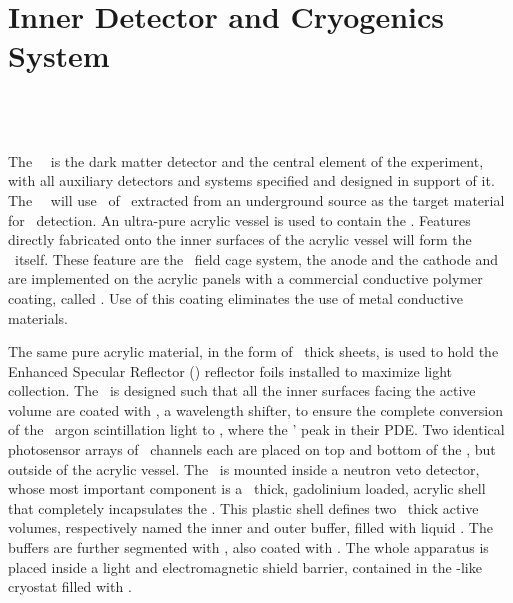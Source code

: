 \section{Inner Detector and Cryogenics System}
\label{sec:TPCCryo}


\subsection{\DSks\ \LArTPC}  
\label{sec:TPC}


The \DSk\ \LArTPC\ is the dark matter detector and the central element of the experiment, with all auxiliary detectors and systems specified and designed in support of it.  The \DSks\ \LArTPC\ will use \DSkCryogenicsCapableLArMass\ of \LAr\ extracted from an underground source as the target material for \WIMP\ detection.   An ultra-pure acrylic vessel is used to contain the \LAr.  Features directly fabricated onto the inner surfaces of the acrylic vessel will form the \TPC\ itself.  These feature are the \TPC\ field cage system, the anode and the cathode and are implemented on the acrylic panels with a commercial conductive polymer coating, called \Clevios.  Use of this coating eliminates the use of metal conductive materials. 

The same pure acrylic material, in the form of \DSkPMMATPCBackPanelThicknessESR\ thick sheets, is used to hold the Enhanced Specular Reflector (\ESR) reflector foils installed to maximize light collection. The \TPC\ is designed such that all the inner surfaces facing the active volume are coated with \TPB, a wavelength shifter, to ensure the complete conversion of the \ArWaveLength\ argon scintillation light to \TPBWaveLength, where the \SiPMs' peak in their PDE.  Two identical photosensor arrays of \DSkTilesHalfNumber\ channels each are placed on top and bottom of the \TPC, but outside of the acrylic vessel. The \TPC\ is mounted inside a neutron veto detector, whose most important component is a \DSkPMMAVetoPanelThickness\ thick, gadolinium loaded, acrylic shell that completely incapsulates the \TPC. This plastic shell defines two \DSkVetoLArThickness\ thick active volumes, respectively named the inner and outer buffer, filled with liquid \AAr. The buffers are further segmented with \ESR, also coated with \TPB. The whole apparatus is placed inside a light and electromagnetic shield barrier, contained in the \pDUNE-like cryostat filled with \AAr.

